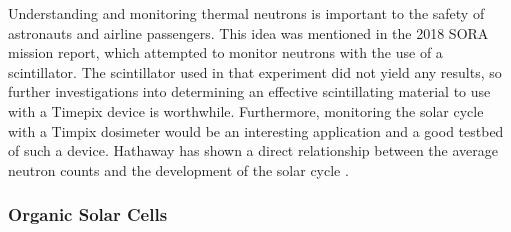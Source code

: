 Understanding and monitoring thermal neutrons is important to the safety of astronauts and airline passengers.
This idea was mentioned in the 2018 SORA mission report, which attempted to monitor neutrons with the use of a scintillator.
The scintillator used in that experiment did not yield any results, so further investigations into determining an effective scintillating material to use with a Timepix device is worthwhile.
Furthermore, monitoring the solar cycle with a Timpix dosimeter would be an interesting application and a good testbed of such a device.
Hathaway has shown a direct relationship between the average neutron counts and the development of the solar cycle \cite{Hathaway-Solar-Cycle}.



\subsubsection{Organic Solar Cells}
